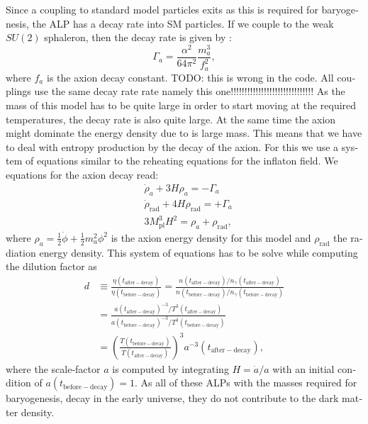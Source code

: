 \documentclass[master,       %
               twoside,        %
               BCOR10mm,       %
               english,ngerman, %
               ]{GAUBM}
\begin{document}
\begin{otherlanguage}{english}
\begin{figure}[H]
\end{figure}
Since a coupling to standard model particles exits as this is required for baryogenesis, the ALP has a decay rate into SM particles. If we couple to the weak $SU(2)$ sphaleron, then the decay rate is given by \cite[eq. 15]{Kusenko_2015_Axion_Leptogenesis}:
\begin{equation}
	\Gamma_a = \frac{\alpha^2}{64\pi^2} \frac{m_a^3}{f_a^2},
\end{equation}
where $f_a$ is the axion decay constant. 
TODO: this is wrong in the code. All couplings use the same decay rate rate namely this one!!!!!!!!!!!!!!!!!!!!!!!!!!!!!!
As the mass of this model has to be quite large in order to start moving at the required temperatures, the decay rate is also quite large.
At the same time the axion might dominate the energy density due to is large mass. This means that we have to deal with entropy production by the decay of the axion.
For this we use a system of equations similar to the reheating equations for the inflaton field. We equations for the axion decay read:
\begin{align}
	&\dot{\rho}_a + 3 H \rho_a = - \Gamma_a \nonumber \\
	&\dot{\rho}_\mathrm{rad} + 4 H \rho_\mathrm{rad} = + \Gamma_a \nonumber \\
	&3 M_\mathrm{pl}^3 H^2 = \rho_a + \rho_\mathrm{rad},
\end{align}
where $\rho_a = \frac{1}{2} \dot{\phi} + \frac{1}{2} m_a^2 \phi^2$ is the axion energy density for this model and $\rho_\mathrm{rad}$ the radiation energy density.
This system of equations has to be solve while computing the dilution factor as
\begin{align}
	d &\equiv \frac{\eta(t_\mathrm{after-decay})}{\eta(t_\mathrm{before-decay})} = \frac{n(t_\mathrm{after-decay}) / n_\gamma(t_\mathrm{after-decay})}{n(t_\mathrm{before-decay}) / n_\gamma(t_\mathrm{before-decay})} \nonumber \\
	&= \frac{a(t_\mathrm{after-decay})^{-3} / T^3(t_\mathrm{after-decay})}{a(t_\mathrm{before-decay})^{-3} / T^3(t_\mathrm{before-decay})} \nonumber \\
	&= \left( \frac{T(t_\mathrm{before-decay})}{T(t_\mathrm{after-decay})} \right)^3 a^{-3}(t_\mathrm{after-decay}),
\end{align}
where the scale-factor $a$ is computed by integrating $H = \dot{a} / a$ with an initial condition of $a(t_\mathrm{before-decay}) = 1$.
As all of these ALPs with the masses required for baryogenesis, decay in the early universe, they do not contribute to the dark matter density.


\end{otherlanguage}
\end{document}
